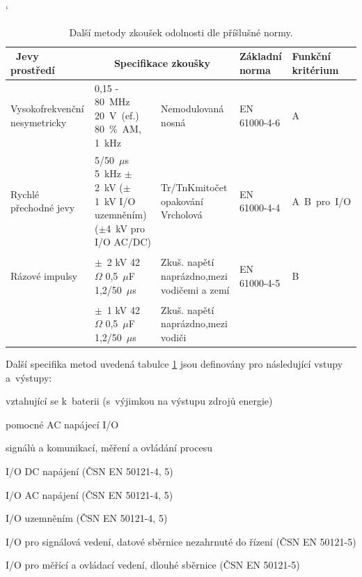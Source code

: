 \begin{table}[!h]
\catcode`
\begin{center}
  	\caption{Další metody zkoušek odolnosti dle příšlušné normy.}
  	\label{tab:emc_odolnosti2}
\begin{tabular}{|p{}|p{}|p{}|p{}|p{}|}
	\hline
	{\bf\ Jevy prostředí} 	& \multicolumn{2}{c}{\bf Specifikace zkoušky}\vline & {\bf Základní norma} & {\bf Funkční kritérium} \\
	\hline
	\hline
Vysokofrekvenční nesymetricky & 0,15 - 80~MHz 20~V~(ef.) 80~\%~AM, 1~kHz & Nemodulovaná nosná	& \begin{center}EN 61000-4-6 \end{center}& \begin{center} A~\end{center} \\ 
	\hline
Rychlé přechodné jevy & 5/50~$\mu$s 5~kHz $\pm$2~kV ($\pm$1~kV I/O uzemněním) ($\pm$4~kV pro I/O AC/DC)& Tr/Tn\linebreak[4]Kmitočet opakování Vrcholová & \begin{center}  EN 61000-4-4 \end{center} & \begin{center} A~B~pro~I/O \end{center} \\
	\hline
	Rázové impulsy & $\pm$~2 kV 42~$\Omega$ 0,5~$\mu$F 1,2/50~$\mu$s  & Zkuš. napětí naprázdno,\linebreak[4]mezi vodičemi a zemí & \begin{center}  EN 61000-4-5 \end{center} & \begin{center} B \end{center} \\
	\cline{2-3}
			& $\pm$~1 kV 42~$\Omega$ 0,5~$\mu$F 1,2/50~$\mu$s& Zkuš. napětí naprázdno,\linebreak[4]mezi vodiči &  &  \\
	\hline
\end{tabular}
\end{center}
\end{table}

Další specifika metod uvedená tabulce \ref{tab:emc_odolnosti2} jsou definovány pro následující vstupy a~výstupy:
\begin{itemize*}
\item vztahující se k~baterii  (s~výjimkou na výstupu zdrojů energie)
\item pomocné AC napájecí I/O
\item signálů a komunikací, měření a ovládání procesu
\item I/O DC napájení (ČSN EN 50121-4, 5)
\item I/O AC napájení (ČSN EN 50121-4, 5)
\item I/O uzemněním (ČSN EN 50121-4, 5)
\item I/O pro signálová vedení, datové sběrnice nezahrnuté do řízení (ČSN EN 50121-5)
\item I/O pro měřící a ovládací vedení, dlouhé sběrnice (ČSN EN 50121-5)
\end{itemize*}

